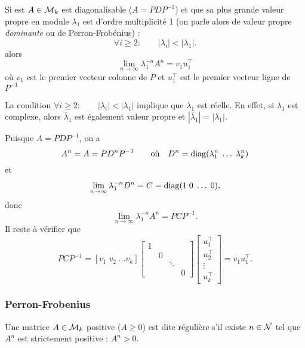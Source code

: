 \begin{proposition*}
  Si est $A \in \mathcal{M}_k$ est diagonalisable ($A = P D P^{-1}$) et que sa plus grande valeur propre en module $\lambda_1$ est d'ordre multiplicité 1 (on parle alors de valeur propre {\em dominante} ou de Perron-Frobénius) :
  $$
  \forall i \geq 2: \qquad |\lambda_i| < |\lambda_1|.
  $$
  alors
  $$
  \lim_{n \rightarrow \infty} \lambda_1^{-n} A^n = v_1 u_1^\top
  $$
  où $v_1$ est le premier vecteur colonne de $P$ et $u_1^\top$ est le premier vecteur ligne de $P^{-1}$
\end{proposition*}

\remark
La condition $\forall i \geq 2: \qquad |\lambda_i| < |\lambda_1|$ implique que $\lambda_1$ est réelle. En effet, si $\lambda_1$ est complexe, alors $\overline{\lambda}_1$ est également valeur propre et $|\overline{\lambda}_1| = |\lambda_1|$.

\proof
  Puisque $A = P D P^{-1}$, on a
  $$
  A^n = A = P D^n P^{-1}
  \qquad \text{où} \quad 
  D^n = \operatorname{diag}(\lambda_1^n \; \dots \; \lambda_k^n)
  $$
  et 
  $$
  \lim_{n \rightarrow \infty} \lambda_1^{-n} D^n = C = \operatorname{diag}(1 \; 0 \; \dots \; 0),
  $$
  donc
  $$
  \lim_{n \rightarrow \infty} \lambda_1^{-n} A^n = P C P^{-1}.
  $$
  Il reste à vérifier que
  $$
  P C P^{-1} 
  = \left[v_1 \; v_2 \; \dots v_k\right] 
  \left[\begin{array}{cccc} 1 & & & \\ & 0 & & \\ & & \ddots & \\ & & & 0 \end{array} \right] 
  \left[\begin{array}{c} u_1^\top \\ u_2^\top \\ \vdots \\ u_k^\top \end{array}\right] 
  = v_1 u_1^\top .
  $$
\eproof

\subsubsection{Perron-Frobenius}

\begin{definition*}
  Une matrice $A \in \mathcal{M}_k$ positive ($A \geq 0$) est dite régulière s'il existe $n \in \mathcal{N}$ tel que $A^n$ est strictement positive : $A^n > 0$.
\end{definition*}

